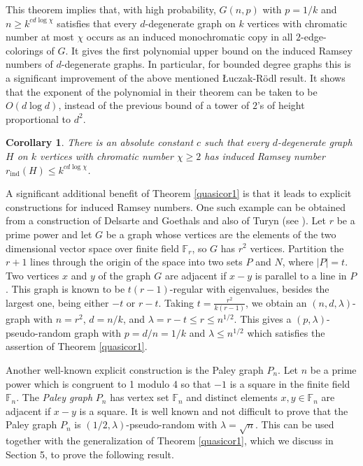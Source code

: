 \documentclass[11pt]{article}
\newtheorem{corollary}[theorem]{Corollary}
\begin{document}
This theorem implies that, with high probability, $G(n,p)$ with
$p=1/k$ and $n \geq k^{cd\log \chi}$  satisfies that every
$d$-degenerate graph on $k$ vertices with chromatic number at most
$\chi$ occurs as an induced monochromatic copy in all $2$-edge-colorings
of $G$. It gives the first polynomial upper bound on the induced
Ramsey numbers of $d$-degenerate graphs. In particular, for bounded
degree graphs this is a significant improvement of the above
mentioned \L uczak-R\"odl result. It shows that the exponent of the
polynomial in their theorem can be taken to be $O(d\log d)$, instead
of the previous bound of a tower of $2$'s of height proportional to
$d^2$.

\begin{corollary}\label{corollaryobvious}
There is an absolute constant $c$ such that every $d$-degenerate
graph $H$ on $k$ vertices with chromatic number $\chi \geq 2$ has
induced Ramsey number $r_{\textrm{ind}}(H) \leq k^{cd \log \chi}$.
\end{corollary}

A significant additional benefit of Theorem \ref{quasicor1} is that
it leads to explicit constructions for induced Ramsey numbers. One
such example can be obtained from a construction of Delsarte and
Goethals and also of Turyn (see \cite{KrSu}). Let $r$ be a prime
power and let $G$ be a graph whose vertices are the elements of the
two dimensional vector space over finite field $\mathbb{F}_r$, so
$G$ has $r^2$ vertices. Partition the $r+1$ lines through the origin
of the space into two sets $P$ and $N$, where $|P|=t$. Two vertices
$x$ and $y$ of the graph $G$ are adjacent if $x-y$ is parallel to a
line in $P$. This graph is known to be $t(r-1)$-regular with
eigenvalues, besides the largest one, being either $-t$ or $r-t$.
Taking $t= \frac{r^2}{k(r-1)}$, we obtain an $(n,d,\lambda)$-graph
with $n=r^2$, $d = n/k$, and $\lambda=r-t\leq r \leq n^{1/2}$. This
gives a $(p,\lambda)$-pseudo-random graph with $p =d/n=1/k$ and
$\lambda \leq n^{1/2}$ which satisfies the assertion of Theorem
\ref{quasicor1}.

Another well-known explicit construction is the Paley graph
$P_n$. Let $n$ be a prime power which is congruent to 1 modulo 4 so that $-1$ is a square in
the finite field $\mathbb{F}_n$. The {\it Paley graph} $P_n$ has vertex
set $\mathbb{F}_n$ and distinct elements $x,y \in \mathbb{F}_n$ are
adjacent if $x-y$ is a square. It is well known and not difficult to prove that
the Paley graph $P_n$ is $(1/2,\lambda)$-pseudo-random with $\lambda=\sqrt{n}$.
This can be used together with the generalization of Theorem \ref{quasicor1}, which we discuss in
Section 5, to prove the following result.
\end{document}
